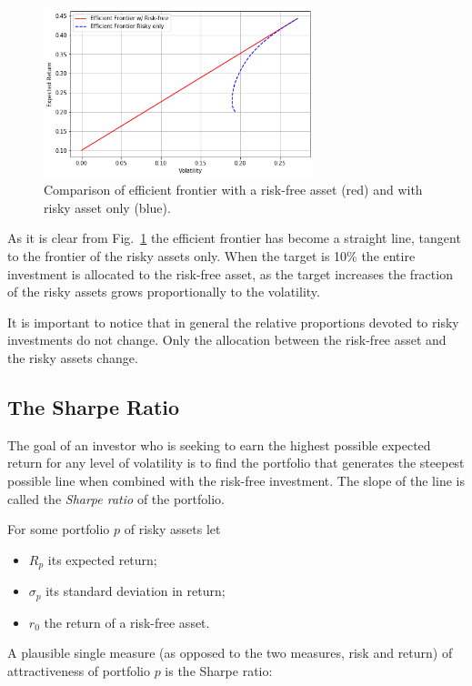 \begin{figure}[htb]
\centering
    \includegraphics[width=0.7\textwidth]{figures/cal.png}
    \caption{Comparison of efficient frontier with a risk-free asset (red) and with risky asset only (blue).}
    \label{fig:cal}
\end{figure}
    
As it is clear from Fig.~\ref{fig:cal} the efficient frontier has become a
straight line, tangent to the frontier of the risky assets only. When
the target is 10\% the entire investment is allocated to the risk-free
asset, as the target increases the fraction of the risky assets grows
proportionally to the volatility. 

It is important to notice that in general the relative proportions
devoted to risky investments do not change. Only the allocation between
the risk-free asset and the risky assets change.

\subsection{The Sharpe Ratio}
\label{the-sharpe-ratio}
The goal of an investor who is seeking to earn the highest possible expected return for any 
level of volatility is to find the portfolio that generates the steepest possible line
when combined with the risk-free investment. The slope of the line is called the \emph{Sharpe ratio} of the portfolio.

For some portfolio \(p\) of risky assets let

\begin{itemize}
\tightlist
\item
  \(R_p\) its expected return;
\item
  \(\sigma_p\) its standard deviation in return;
\item
  \(r_0\) the return of a risk-free asset.
\end{itemize}

A plausible single measure (as opposed to the two measures, risk and
return) of attractiveness of portfolio \(p\) is the Sharpe ratio:

